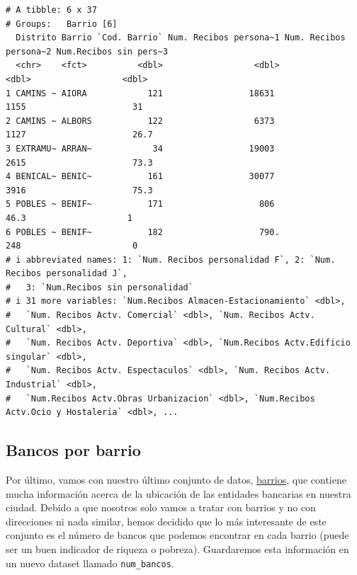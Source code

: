 \documentclass[notspecified,article,submit,moreauthors,pdftex]{Definitions/mdpi}
\begin{document}
\begin{verbatim}
# A tibble: 6 x 37
# Groups:   Barrio [6]
  Distrito Barrio `Cod. Barrio` Num. Recibos persona~1 Num. Recibos persona~2 Num.Recibos sin pers~3
  <chr>    <fct>          <dbl>                  <dbl>                  <dbl>                  <dbl>
1 CAMINS ~ AIORA            121                 18631                  1155                     31  
2 CAMINS ~ ALBORS           122                  6373                  1127                     26.7
3 EXTRAMU~ ARRAN~            34                 19003                  2615                     73.3
4 BENICAL~ BENIC~           161                 30077                  3916                     75.3
5 POBLES ~ BENIF~           171                   806                    46.3                    1  
6 POBLES ~ BENIF~           182                   790.                  248                      0  
# i abbreviated names: 1: `Num. Recibos personalidad F`, 2: `Num. Recibos personalidad J`,
#   3: `Num.Recibos sin personalidad`
# i 31 more variables: `Num.Recibos Almacen-Estacionamiento` <dbl>,
#   `Num. Recibos Actv. Comercial` <dbl>, `Num. Recibos Actv. Cultural` <dbl>,
#   `Num. Recibos Actv. Deportiva` <dbl>, `Num.Recibos Actv.Edificio singular` <dbl>,
#   `Num. Recibos Actv. Espectaculos` <dbl>, `Num. Recibos Actv. Industrial` <dbl>,
#   `Num.Recibos Actv.Obras Urbanizacion` <dbl>, `Num.Recibos Actv.Ocio y Hostaleria` <dbl>, ...
\end{verbatim}

\hypertarget{bancos-por-barrio}{%
\subsection{Bancos por barrio}\label{bancos-por-barrio}}

Por último, vamos con nuestro último conjunto de datos,
\href{https://valencia.opendatasoft.com/explore/dataset/bancs-en-via-publica-bancos-en-via-publica/table/}{barrios},
que contiene mucha información acerca de la ubicación de las entidades
bancarias en nuestra ciudad. Debido a que nosotros solo vamos a tratar
con barrios y no con direcciones ni nada similar, hemos decidido que lo
más interesante de este conjunto es el número de bancos que podemos
encontrar en cada barrio (puede ser un buen indicador de riqueza o
pobreza). Guardaremos esta información en un nuevo dataset llamado
\texttt{num\_bancos}.
\end{document}
